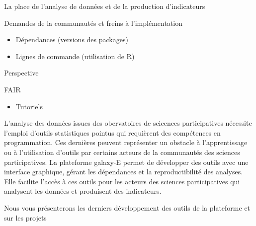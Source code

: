 \documentclass[ignorenonframetext,]{beamer}
\providecommand{\tightlist}{%
  \setlength{\itemsep}{0pt}\setlength{\parskip}{0pt}}
\begin{document}
\begin{frame}{La place de l'analyse de données et de la production
d'indicateurs}

\end{frame}

\begin{frame}{Demandes de la communautés et freins à l'implémentation}

\begin{itemize}
\tightlist
\item
  Dépendances (versions des packages)
\item
  Lignes de commande (utilisation de R)
\end{itemize}

\end{frame}

\begin{frame}{Perspective}

FAIR

\begin{itemize}
\tightlist
\item
  Tutoriels
\end{itemize}

L'analyse des données issues des obervatoires de scicences
participatives nécessite l'emploi d'outils statistiques pointus qui
requièrent des compétences en programmation. Ces dernières peuvent
représenter un obstacle à l'apprentissage ou à l'utilisation d'outils
par certains acteurs de la communautés des sciences participatives. La
plateforme galaxy-E permet de développer des outils avec une interface
graphique, gérant les dépendances et la reproductibilité des analyses.
Elle facilite l'accès à ces outils pour les acteurs des sciences
participatives qui analysent les données et produisent des indicateurs.

Nous vous présenterons les derniers développement des outils de la
plateforme et sur les projets

\end{frame}
\end{document}
